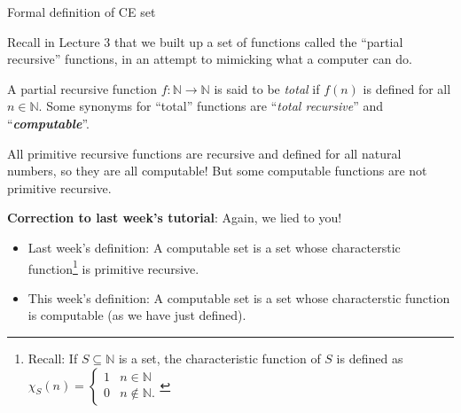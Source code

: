 \documentclass{beamer}
\newcommand{\N}{\mathbb N}
\begin{document}
\begin{frame}{Formal definition of CE set}

Recall in Lecture 3 that we built up a set of functions called the ``partial recursive'' functions, in an attempt to mimicking what a computer can do.

\vspace{2mm}
\pause

A partial recursive function $f: \N \to \N$ is said to be \textit{total} if $f(n)$ is defined for all $n \in \N$. Some synonyms for ``total'' functions are ``\textit{total recursive}'' and ``\textit{\textbf{computable}}''. 

\vspace{2mm}
\pause

All primitive recursive functions are recursive and defined for all natural numbers, so they are all computable! But some computable functions are not primitive recursive.

\vspace{2mm}
\pause

\color{red}

\textbf{Correction to last week's tutorial}: Again, we lied to you! 
\begin{itemize}
    \item Last week's definition: A computable set is a set whose characterstic function\footnote{Recall: If $S \subseteq \N$ is a set, the characteristic function of $S$ is defined as $\chi_S(n) = \begin{cases}
    1 & n \in \N\\
    0 & n \notin \N.
    \end{cases}$} is primitive recursive. 
    \item This week's definition: A computable set is a set whose characterstic function is computable (as  we have just defined). 
\end{itemize}

\end{frame}
\end{document}
